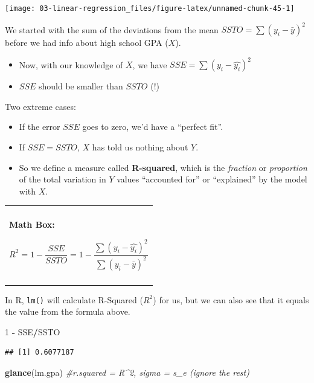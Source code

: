 \documentclass[
]{book}
\newenvironment{Shaded}{\begin{snugshade}}{\end{snugshade}}
\newcommand{\CommentTok}[1]{\textcolor[rgb]{0.56,0.35,0.01}{\textit{#1}}}
\newcommand{\DecValTok}[1]{\textcolor[rgb]{0.00,0.00,0.81}{#1}}
\newcommand{\KeywordTok}[1]{\textcolor[rgb]{0.13,0.29,0.53}{\textbf{#1}}}
\newcommand{\NormalTok}[1]{#1}
\newcommand{\OperatorTok}[1]{\textcolor[rgb]{0.81,0.36,0.00}{\textbf{#1}}}
\newcommand{\StringTok}[1]{\textcolor[rgb]{0.31,0.60,0.02}{#1}}
\newenvironment{mathbox}
{
    \begin{center}
    
    \begin{tabular}{|p{0.8\textwidth}|}
    \rowcolor{LightYellow}
    \hline\\
    \rowcolor{LightYellow}
    \textbf{Math Box:}
}
{
    \\\rowcolor{LightYellow}
    \\\hline
    \end{tabular} 
    \end{center}
}
\begin{document}
\begin{center}\texttt{[image: 03-linear-regression\_files/figure-latex/unnamed-chunk-45-1]} \end{center}

We started with the sum of the deviations from the mean \(SSTO = \sum{(y_i - \bar{y})^2}\) before we had info about high school GPA (\(X\)).

\begin{itemize}
\item
  Now, with our knowledge of \(X\), we have \(SSE = \sum{(y_i - \hat{y_i})^2}\)
\item
  \(SSE\) should be smaller than \(SSTO\) (!)
\end{itemize}

Two extreme cases:

\begin{itemize}
\item
  If the error \(SSE\) goes to zero, we'd have a ``perfect fit''.
\item
  If \(SSE = SSTO\), \(X\) has told us nothing about \(Y\).
\item
  So we define a measure called \textbf{R-squared}, which is the \emph{fraction} or \emph{proportion} of the total variation in \(Y\) values ``accounted for'' or ``explained'' by the model with \(X\).
\end{itemize}

\begin{mathbox}
\[ R^2 = 1 - \frac{SSE}{SSTO} = 1 - \frac{ \sum{(y_i - \hat{y_i})^2}}{ \sum{(y_i - \bar{y})^2}}\]
\end{mathbox}

In R, \texttt{lm()} will calculate R-Squared (\(R^2\)) for us, but we can also see that it equals the value from the formula above.

\begin{Shaded}
\begin{Highlighting}[]
\DecValTok{1} \OperatorTok{-}\StringTok{ }\NormalTok{SSE}\OperatorTok{/}\NormalTok{SSTO}
\end{Highlighting}
\end{Shaded}

\begin{verbatim}
## [1] 0.6077187
\end{verbatim}

\begin{Shaded}
\begin{Highlighting}[]
\KeywordTok{glance}\NormalTok{(lm.gpa) }\CommentTok{#r.squared = R^2, sigma = s_e (ignore the rest)}
\end{Highlighting}
\end{Shaded}
\end{document}
